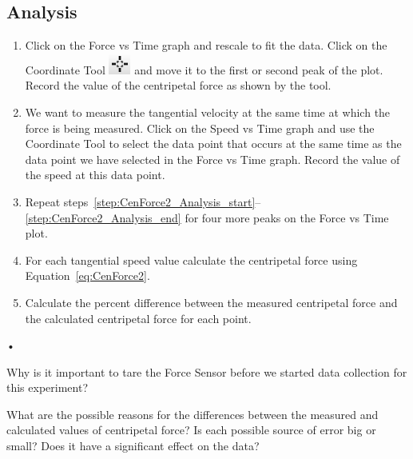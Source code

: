 \documentclass[main.tex]{subfiles}
\begin{document}
\subsection*{Analysis}
\begin{enumerate}
\item \label{step:CenForce2_Analysis_start}
Click on the Force vs Time graph and rescale to fit the data. Click on the Coordinate Tool \includegraphics{Coordinates_Tool} and move it to the first or second peak of the plot. Record the value of the centripetal force as shown by the tool.
\item \label{step:CenForce2_Analysis_end}
We want to measure the tangential velocity at the same time at which the force is being measured. Click on the Speed vs Time graph and use the Coordinate Tool to select the data point that occurs at the same time as the data point we have selected in the Force vs Time graph. Record the value of the speed at this data point.
\item
Repeat steps~\ref{step:CenForce2_Analysis_start}--\ref{step:CenForce2_Analysis_end} for four more peaks on the Force vs Time plot.
\item
For each tangential speed value calculate the centripetal force using Equation~\eqref{eq:CenForce2}.
\item
Calculate the percent difference between the measured centripetal force and the calculated centripetal force for each point.
\end{enumerate}•

\begin{question}
Why is it important to tare the Force Sensor before we started data collection for this experiment?
\end{question}
\begin{question}
What are the possible reasons for the differences between the measured and calculated values of centripetal force? Is each possible source of error big or small? Does it have a significant effect on the data?
\end{question}
\end{document}
